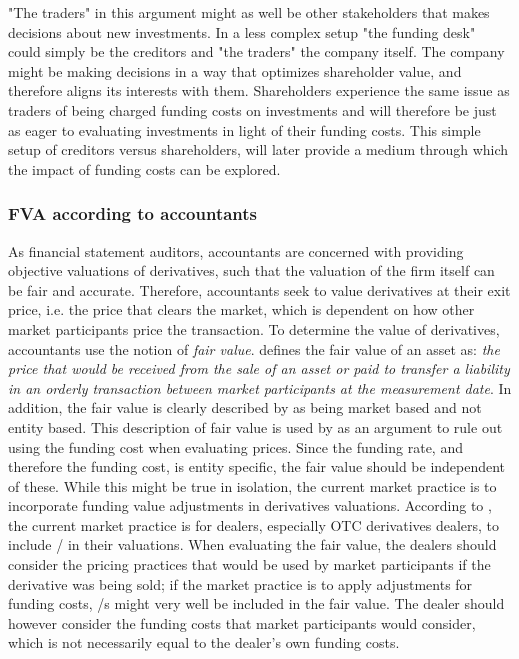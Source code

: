 \documentclass[../../../main.tex]{subfiles}
\begin{document}
            "The traders" in this argument might as well be other stakeholders that makes decisions about new investments.
            In a less complex setup "the funding desk" could simply be the creditors and "the traders" the company itself.
            The company might be making decisions in a way that optimizes shareholder value,
            and therefore aligns its interests with them.
            Shareholders experience the same issue as traders of being charged funding costs on investments 
            and will therefore be just as eager to evaluating investments in light of their funding costs.
            This simple setup of creditors versus shareholders, 
            will later provide a medium through which the impact of funding costs can be explored.

        \subsubsection{FVA according to accountants}
            As financial statement auditors, accountants are concerned with providing objective valuations of derivatives,
            such that the valuation of the firm itself can be fair and accurate.
            Therefore, accountants seek to value derivatives at their exit price, i.e. the price that clears the market,
            which is dependent on how other market participants price the transaction.
            To determine the value of derivatives, accountants use the notion of \textit{fair value}.
            \textcite{IFRS13} defines the fair value of an asset as: 
            \textit{the price that would be received from the sale of an asset or paid to transfer a liability
            in an orderly transaction between market participants at the measurement date}.
            In addition, the fair value is clearly described by \textcite{IFRS13} as being market based and not entity based.
            This description of fair value is used by \textcite{HullWhiteFVA} as an argument to
            rule out using the funding cost when evaluating prices.
            Since the funding rate, and therefore the funding cost, is entity specific,
            the fair value should be independent of these.
            While this might be true in isolation, 
            the current market practice is to incorporate funding value adjustments in derivatives valuations.
            According to \textcite{KPMGFVA}, the current market practice is for dealers, especially OTC derivatives dealers,
            to include \FVA/ in their valuations.  
            When evaluating the fair value, the dealers should consider the pricing practices 
            that would be used by market participants if the derivative was being sold;
            if the market practice is to apply adjustments for funding costs,
            \FVA/s might very well be included in the fair value.
            The dealer should however consider the funding costs that market participants would consider,
            which is not necessarily equal to the dealer's own funding costs.
\end{document}
